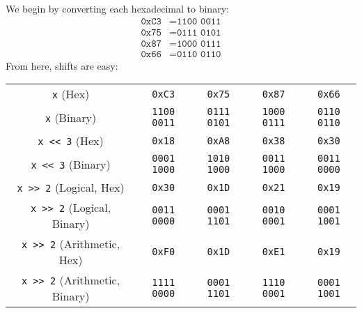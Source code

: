 \documentclass[12pt]{article}
\newenvironment{sol}[1][Solution]{\begin{trivlist}
		\item[\hskip \labelsep {\bfseries #1:}]}{\end{trivlist}}
\begin{document}
\begin{sol}
	We begin by converting each hexadecimal to binary:
	\begin{align*}
		\texttt{0xC3} &= \texttt{1100 0011}\\
		\texttt{0x75} &= \texttt{0111 0101}\\
		\texttt{0x87} &= \texttt{1000 0111}\\
		\texttt{0x66} &= \texttt{0110 0110}
	\end{align*}
	From here, shifts are easy:
	\begin{center}
		\begin{tabular}{c|cccc}
			\texttt{x} (Hex) & \texttt{0xC3} & \texttt{0x75} & \texttt{0x87} & \texttt{0x66} \\
			\texttt{x} (Binary) & \texttt{1100 0011} & \texttt{0111 0101} & \texttt{1000 0111} & \texttt{0110 0110} \\
			\hline
			\texttt{x << 3} (Hex) & \texttt{0x18} & \texttt{0xA8} & \texttt{0x38} &  \texttt{0x30}\\
			\texttt{x << 3} (Binary) & \texttt{0001 1000} & \texttt{1010 1000} & \texttt{0011 1000} &  \texttt{0011 0000}\\
			\hline
			
			\texttt{x >> 2} (Logical, Hex) & \texttt{0x30} & \texttt{0x1D} & \texttt{0x21} & \texttt{0x19} \\
			\texttt{x >> 2} (Logical, Binary) & \texttt{0011 0000} & \texttt{0001 1101} & \texttt{0010 0001} & \texttt{0001 1001} \\
			\hline
			
			\texttt{x >> 2} (Arithmetic, Hex)  & \texttt{0xF0} & \texttt{0x1D} & \texttt{0xE1} & \texttt{0x19} \\
			\texttt{x >> 2} (Arithmetic, Binary)  & \texttt{1111 0000} & \texttt{0001 1101} & \texttt{1110 0001} & \texttt{0001 1001} 
		\end{tabular}
	\end{center}
\end{sol}
\end{document}
